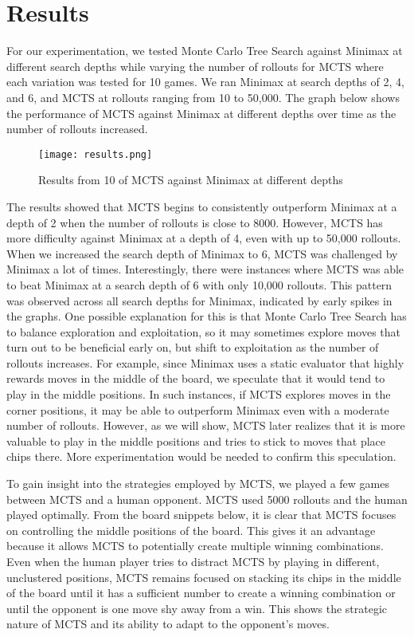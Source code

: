 \documentclass[11pt]{article}
\begin{document}
\section{Results}

For our experimentation, we tested Monte Carlo Tree Search against Minimax at different search depths 
while varying the number of rollouts for MCTS where each variation was tested for 10 games. 
We ran Minimax at search depths of 2, 4, and 6, and MCTS at rollouts ranging from 10 to 50,000. 
The graph below shows the performance of MCTS against Minimax at different depths over time as 
the number of rollouts increased. 

\FloatBarrier
\begin{center}
  \begin{figure}[h]
      \texttt{[image: results.png]}
    \caption{Results from 10 of MCTS against Minimax at different depths}
    \label{Experiment Results}
  \end{figure}
\end{center}
\FloatBarrier

The results showed that MCTS begins to consistently outperform Minimax at a depth of 2 when the number 
of rollouts is close to 8000. However, MCTS has more difficulty against Minimax at a depth of 4, 
even with up to 50,000 rollouts. When we increased the search depth of Minimax to 6, 
MCTS was challenged by Minimax a lot of times. Interestingly, there were instances where MCTS was able to 
beat Minimax at a search depth of 6 with only 10,000 rollouts. This pattern was observed across all search 
depths for Minimax, indicated by early spikes in the graphs. 
One possible explanation for this is that Monte Carlo Tree Search has to balance exploration 
and exploitation, so it may sometimes explore moves that turn out to be beneficial early on, 
but shift to exploitation as the number of rollouts increases. For example, since Minimax uses a 
static evaluator that highly rewards moves in the middle of the board, we speculate that it would tend 
to play in the middle positions. In such instances, if MCTS explores moves in the corner positions, 
it may be able to outperform Minimax even with a moderate number of rollouts. 
However, as we will show, MCTS later realizes that it is more valuable to play in the middle positions 
and tries to stick to moves that place chips there. More experimentation would be needed to confirm this speculation. 

To gain insight into the strategies employed by MCTS, we played a few games between MCTS and a human opponent. 
MCTS used 5000 rollouts and the human played optimally. From the board snippets below, it is clear that MCTS 
focuses on controlling the middle positions of the board. This gives it an advantage because it allows MCTS 
to potentially create multiple winning combinations. Even when the human player tries to distract MCTS by 
playing in different, unclustered positions, MCTS remains focused on stacking its chips in the middle of 
the board until it has a sufficient number to create a winning combination or until the opponent is one 
move shy away from a win. This shows the strategic nature of MCTS and its ability to adapt to the opponent's moves. 
\end{document}
